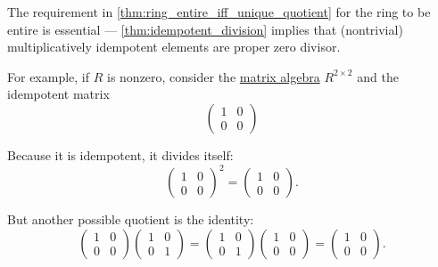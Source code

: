 \begin{example}\label{ex:nonunique_divisor}
  The requirement in \cref{thm:ring_entire_iff_unique_quotient} for the ring to be entire is essential --- \cref{thm:idempotent_division} implies that (nontrivial) multiplicatively idempotent elements are proper zero divisor.

  For example, if \( R \) is nonzero, consider the \hyperref[thm:matrix_algebra]{matrix algebra} \( R^{2 \times 2} \) and the idempotent matrix
  \begin{equation*}
    \begin{pmatrix}
      1 & 0 \\
      0 & 0
    \end{pmatrix}
  \end{equation*}

  Because it is idempotent, it divides itself:
  \begin{equation*}
    \begin{pmatrix}
      1 & 0 \\
      0 & 0
    \end{pmatrix}^2
    =
    \begin{pmatrix}
      1 & 0 \\
      0 & 0
    \end{pmatrix}.
  \end{equation*}

  But another possible quotient is the identity:
  \begin{equation*}
    \begin{pmatrix}
      1 & 0 \\
      0 & 0
    \end{pmatrix}
    \begin{pmatrix}
      1 & 0 \\
      0 & 1
    \end{pmatrix}
    =
    \begin{pmatrix}
      1 & 0 \\
      0 & 1
    \end{pmatrix}
    \begin{pmatrix}
      1 & 0 \\
      0 & 0
    \end{pmatrix}
    =
    \begin{pmatrix}
      1 & 0 \\
      0 & 0
    \end{pmatrix}.
  \end{equation*}
\end{example}

